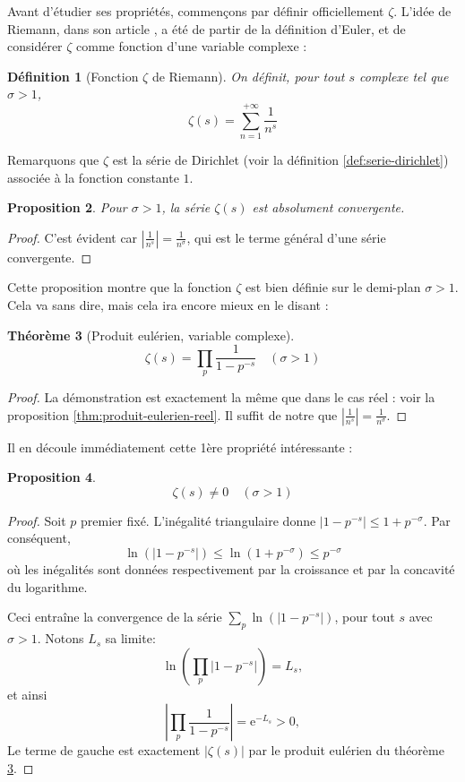\documentclass[french]{report}
\newtheorem{theorem}{Théorème}[section]
\newtheorem{definition}[theorem]{Définition}
\newtheorem{proposition}[theorem]{Proposition}
\begin{document}
Avant d'étudier ses propriétés, commençons par définir officiellement $\zeta$. L'idée de Riemann, dans son article \cite{riemann}, a été de partir de la définition d'Euler, et de considérer $\zeta$ comme fonction d'une variable complexe :

\begin{definition}[Fonction $\zeta$ de Riemann]\label{def:zeta-definition}
  On définit, pour tout $s$ complexe tel que $\sigma > 1$,
  \[ \zeta(s) = \sum_{n=1}^{+\infty}\frac{1}{n^s} \]
\end{definition}

Remarquons que $\zeta$ est la série de Dirichlet (voir la définition \ref{def:serie-dirichlet}) associée à la fonction constante $1$.

\begin{proposition}
  Pour $\sigma > 1$, la série $\zeta(s)$ est absolument convergente.
\end{proposition}

\begin{proof}
  C'est évident car $|\frac{1}{n^s}| = \frac{1}{n^{\sigma}}$, qui est le terme général d'une série convergente.
\end{proof}

Cette proposition montre que la fonction $\zeta$ est bien définie sur le demi-plan $\sigma > 1$.
\\

Cela va sans dire, mais cela ira encore mieux en le disant :

\begin{theorem}[Produit eulérien, variable complexe]\label{thm:produit-eulerien-complexe}
  \[ \zeta(s) = \prod_p\frac{1}{1-p^{-s}}\quad(\sigma>1)\]
\end{theorem}

\begin{proof}
  La démonstration est exactement la même que dans le cas réel : voir la proposition \ref{thm:produit-eulerien-reel}. Il suffit de notre que $|\frac{1}{n^s}|=\frac{1}{n^\sigma}$.
\end{proof}

Il en découle immédiatement cette 1ère propriété intéressante :

\begin{proposition}\label{eq:zeta-non-nul-produit-eulerien}
  \[ \zeta(s) \neq 0 \quad(\sigma > 1)\]
\end{proposition}

\begin{proof}
  Soit $p$ premier fixé. L'inégalité triangulaire donne $|1-p^{-s}|\leq1+p^{-\sigma}$. Par conséquent,
  \[\ln(|1-p^{-s}|)\leq\ln(1+p^{-\sigma})\leq p^{-\sigma} \]
  où les inégalités sont données respectivement par la croissance et par la concavité du logarithme.

  Ceci entraîne la convergence de la série $\sum_p\ln(|1-p^{-s}|)$, pour tout $s$ avec $\sigma>1$. Notons $L_s$ sa limite:
  \[ \ln\left(\prod_p|1-p^{-s}|\right) = L_s, \]
  et ainsi
  \[ \left|\prod_p\frac{1}{1-p^{-s}}\right| = \mathrm{e}^{-L_s} > 0, \]
  Le terme de gauche est exactement $|\zeta(s)|$ par le produit eulérien du théorème \ref{thm:produit-eulerien-complexe}.

\end{proof}
\end{document}

